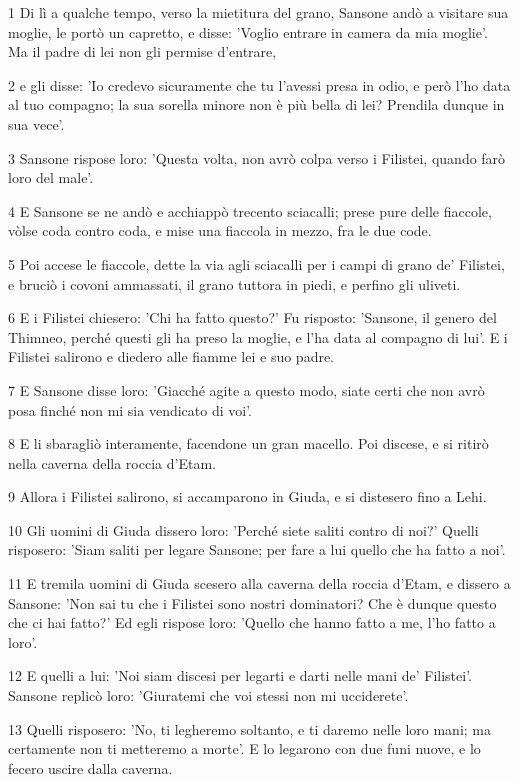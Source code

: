 \par 1 Di lì a qualche tempo, verso la mietitura del grano, Sansone andò a visitare sua moglie, le portò un capretto, e disse: 'Voglio entrare in camera da mia moglie'. Ma il padre di lei non gli permise d'entrare,
\par 2 e gli disse: 'Io credevo sicuramente che tu l'avessi presa in odio, e però l'ho data al tuo compagno; la sua sorella minore non è più bella di lei? Prendila dunque in sua vece'.
\par 3 Sansone rispose loro: 'Questa volta, non avrò colpa verso i Filistei, quando farò loro del male'.
\par 4 E Sansone se ne andò e acchiappò trecento sciacalli; prese pure delle fiaccole, vòlse coda contro coda, e mise una fiaccola in mezzo, fra le due code.
\par 5 Poi accese le fiaccole, dette la via agli sciacalli per i campi di grano de' Filistei, e bruciò i covoni ammassati, il grano tuttora in piedi, e perfino gli uliveti.
\par 6 E i Filistei chiesero: 'Chi ha fatto questo?' Fu risposto: 'Sansone, il genero del Thimneo, perché questi gli ha preso la moglie, e l'ha data al compagno di lui'. E i Filistei salirono e diedero alle fiamme lei e suo padre.
\par 7 E Sansone disse loro: 'Giacché agite a questo modo, siate certi che non avrò posa finché non mi sia vendicato di voi'.
\par 8 E li sbaragliò interamente, facendone un gran macello. Poi discese, e si ritirò nella caverna della roccia d'Etam.
\par 9 Allora i Filistei salirono, si accamparono in Giuda, e si distesero fino a Lehi.
\par 10 Gli uomini di Giuda dissero loro: 'Perché siete saliti contro di noi?' Quelli risposero: 'Siam saliti per legare Sansone; per fare a lui quello che ha fatto a noi'.
\par 11 E tremila uomini di Giuda scesero alla caverna della roccia d'Etam, e dissero a Sansone: 'Non sai tu che i Filistei sono nostri dominatori? Che è dunque questo che ci hai fatto?' Ed egli rispose loro: 'Quello che hanno fatto a me, l'ho fatto a loro'.
\par 12 E quelli a lui: 'Noi siam discesi per legarti e darti nelle mani de' Filistei'. Sansone replicò loro: 'Giuratemi che voi stessi non mi ucciderete'.
\par 13 Quelli risposero: 'No, ti legheremo soltanto, e ti daremo nelle loro mani; ma certamente non ti metteremo a morte'. E lo legarono con due funi nuove, e lo fecero uscire dalla caverna.
